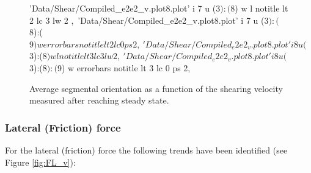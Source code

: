 \documentclass[aps,prb,reprint,superscriptaddress, a4paper]{revtex4-1}
\begin{document}
\begin{figure}
\begin{center}
\begin{gnuplot}[terminal=pdf, terminaloptions={size \SERFigwidth cm, \SERFigheight cm color solid}]
					'Data/Shear/Compiled_e2e2_v.plot8.plot' i 7 u ($3):($8) w l notitle  lt 2 lc 3 lw 2 ,\
					'Data/Shear/Compiled_e2e2_v.plot8.plot' i 7 u ($3):($8):($9) w errorbars notitle  lt 2 lc 0 ps 2,\
					'Data/Shear/Compiled_e2e2_v.plot8.plot' i 8 u ($3):($8) w l notitle  lt 3 lc 3 lw 2 ,\
					'Data/Shear/Compiled_e2e2_v.plot8.plot' i 8 u ($3):($8):($9) w errorbars notitle  lt 3 lc 0 ps 2,\
		\end{gnuplot}
		\caption{Average segmental orientation as a function of the shearing velocity measured after reaching steady state.}
		\label{fig:P2_v}
	\end{center}
 \end{figure}



\subsubsection{Lateral (Friction) force}

For the lateral (friction) force the following trends have been identified (see Figure \ref{fig:FL_v}):
\end{document}

